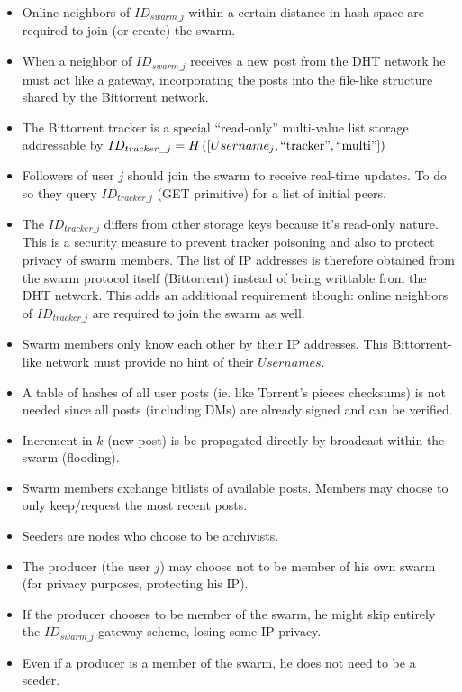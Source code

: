 \documentclass[a4paper,10pt]{article}
\begin{document}
\begin{itemize}
 \item Online neighbors of $ID_{swarm\_j}$ within a certain distance in hash space are required to join (or create) the swarm.
 \item When a neighbor of $ID_{swarm\_j}$ receives a new post from the DHT network he must act like a gateway, incorporating the posts into the file-like structure shared by the Bittorrent network.
 \item The Bittorrent tracker is a special ``read-only'' multi-value list storage addressable by
          $ID_{tracker\_j} = H\left( [Username_j,\textnormal{``tracker''}, \textnormal{``multi''}] \right)$
 \item Followers of user $j$ should join the swarm to receive real-time updates. To do so they query $ID_{tracker\_j}$ (GET primitive) for a list of initial peers.
 \item The $ID_{tracker\_j}$ differs from other storage keys because it's read-only nature. This is a security measure to prevent tracker poisoning and also to protect privacy of swarm members. The list of IP addresses is therefore obtained from the swarm protocol itself (Bittorrent) instead of being writtable from the DHT network. This adds an additional requirement though: online neighbors of $ID_{tracker\_j}$ are required to join the swarm as well. 
 \item Swarm members only know each other by their IP addresses. This Bittorrent-like network must provide no hint of their $Usernames$.
 \item A table of hashes of all user posts (ie. like Torrent's pieces checksums) is not needed since all posts (including DMs) are already signed and can be verified.
 \item Increment in $k$ (new post) is be propagated directly by broadcast within the swarm (flooding).
 \item Swarm members exchange bitlists of available posts. Members may choose to only keep/request the most recent posts.
 \item Seeders are nodes who choose to be archivists.
 \item The producer (the user $j$) may choose not to be member of his own swarm (for privacy purposes, protecting his IP).
 \item If the producer chooses to be member of the swarm, he might skip entirely the $ID_{swarm\_j}$ gateway scheme, losing some IP privacy.
 \item Even if a producer is a member of the swarm, he does not need to be a seeder.

\end{itemize}
\end{document}
